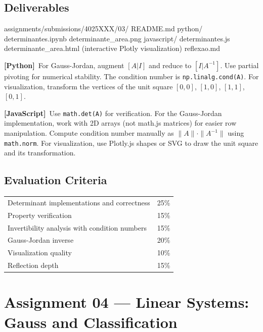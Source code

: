 \documentclass[a4paper,11pt]{article}
\newcommand{\pylabel}{\textcolor{pyborder}{\textbf{[Python]}}}
\newcommand{\jslabel}{\textcolor{jsborder}{\textbf{[JavaScript]}}}
\begin{document}
\subsection{Deliverables}

\begin{code}
assignments/submissions/4025XXX/03/
  README.md
  python/
    determinantes.ipynb
    determinante_area.png
  javascript/
    determinantes.js
    determinante_area.html    (interactive Plotly visualization)
  reflexao.md
\end{code}

\begin{hintbox}
  \pylabel\ For Gauss-Jordan, augment $[A|I]$ and reduce to $[I|A^{-1}]$. Use partial pivoting for numerical stability. The condition number is \texttt{np.linalg.cond(A)}. For visualization, transform the vertices of the unit square $[0,0]$, $[1,0]$, $[1,1]$, $[0,1]$.

  \medskip

  \jslabel\ Use \texttt{math.det(A)} for verification. For the Gauss-Jordan implementation, work with 2D arrays (not math.js matrices) for easier row manipulation. Compute condition number manually as $\|A\| \cdot \|A^{-1}\|$ using \texttt{math.norm}. For visualization, use Plotly.js shapes or SVG to draw the unit square and its transformation.
\end{hintbox}

\subsection{Evaluation Criteria}

\begin{tabularx}{\textwidth}{X r}
  Determinant implementations and correctness & 25\% \\
  Property verification & 15\% \\
  Invertibility analysis with condition numbers & 15\% \\
  Gauss-Jordan inverse & 20\% \\
  Visualization quality & 10\% \\
  Reflection depth & 15\% \\
\end{tabularx}

\newpage

\section{Assignment 04 --- Linear Systems: Gauss and Classification}
\end{document}
